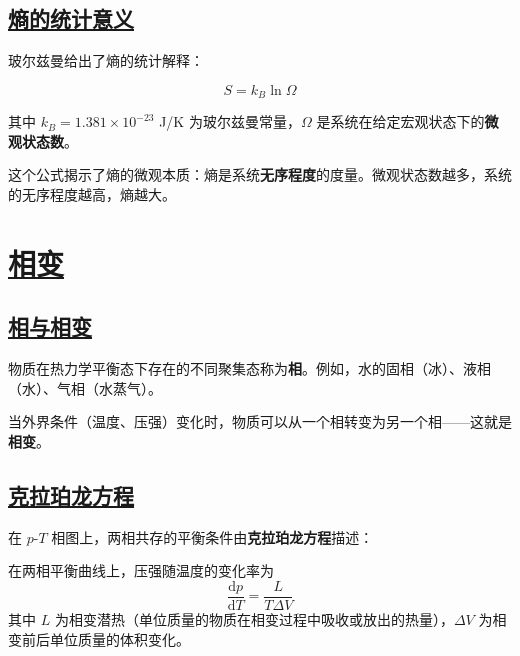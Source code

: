 \subsection{\protect\hyperlink{:}{熵的统计意义}}

玻尔兹曼给出了熵的统计解释：

\begin{equation}
    S = k_B \ln\Omega
\end{equation}

其中 $k_B = 1.381 \times 10^{-23}$ J/K 为玻尔兹曼常量，$\Omega$ 是系统在给定宏观状态下的\textbf{微观状态数}。

这个公式揭示了熵的微观本质：熵是系统\textbf{无序程度}的度量。微观状态数越多，系统的无序程度越高，熵越大。


\section{\protect\hyperlink{:}{相变}}

\subsection{\protect\hyperlink{:}{相与相变}}

\begin{definition}[相]
    物质在热力学平衡态下存在的不同聚集态称为\textbf{相}。例如，水的固相（冰）、液相（水）、气相（水蒸气）。
\end{definition}

当外界条件（温度、压强）变化时，物质可以从一个相转变为另一个相——这就是\textbf{相变}。

\subsection{\protect\hyperlink{:}{克拉珀龙方程}}

在 $p$-$T$ 相图上，两相共存的平衡条件由\textbf{克拉珀龙方程}描述：

\begin{theorem}[克拉珀龙方程]
    在两相平衡曲线上，压强随温度的变化率为
    \begin{equation}
        \frac{\mathrm{d}p}{\mathrm{d}T} = \frac{L}{T\Delta V}
    \end{equation}
    其中 $L$ 为相变潜热（单位质量的物质在相变过程中吸收或放出的热量），$\Delta V$ 为相变前后单位质量的体积变化。
\end{theorem}

